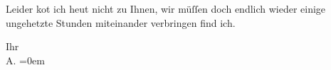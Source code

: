 \pstart
           Leider ko{\geminationn}t ich heut nicht zu Ihnen, wir müſſen doch
               endlich wieder {\pb}einige ungehetzte Stunden miteinander
               verbringen find ich.\pend
           
\pstart
           Ihr{\\[\baselineskip]}\spacefill\mbox{A.}\pend
           \leftskip=0em{}\endnumbering{}  \newcommand{\dateiname}{L01215}\newcommand{\titel}{Arthur Schnitzler an Richard Beer-Hofmann, [31. 3. oder 1. 4.]. 1902}\newcommand{\editorInnen}{Martin Anton Müller und Gerd-Hermann Susen}
